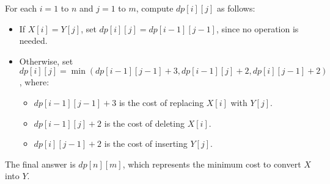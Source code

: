 \documentclass[12pt,a4paper]{article}
\begin{document}
\begin{enumerate}
    For each \( i = 1 \) to \( n \) and \( j = 1 \) to \( m \), compute \( dp[i][j] \) as follows:
        \begin{itemize}
            \item If \( X[i] = Y[j] \), set \( dp[i][j] = dp[i-1][j-1] \), since no operation is needed.
            \item Otherwise, set \( dp[i][j] = \min(dp[i-1][j-1] + 3, dp[i-1][j] + 2, dp[i][j-1] + 2) \), where:
                \begin{itemize}
                    \item \( dp[i-1][j-1] + 3 \) is the cost of replacing \( X[i] \) with \( Y[j] \).
                    \item \( dp[i-1][j] + 2 \) is the cost of deleting \( X[i] \).
                    \item \( dp[i][j-1] + 2 \) is the cost of inserting \( Y[j] \).
                \end{itemize}
        \end{itemize}

    The final answer is \( dp[n][m] \), which represents the minimum cost to convert \( X \) into \( Y \).

\end{enumerate}
\end{document}
